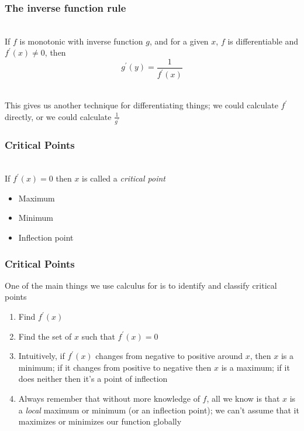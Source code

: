 \documentclass[aspectratio=169, handout]{beamer}
\numberwithin{equation}{section}
\begin{document}
\begin{frame}
\frametitle{The inverse function rule}

\ \\If $f$ is monotonic with inverse function $g$, and for a given $x$, $f$ is differentiable and $f^\prime(x)\not=0$, then $$g^\prime(y) = \frac{1}{f^\prime(x)}$$ \pause


\ \\This gives us another technique for differentiating things; we could calculate $f^\prime$ directly, or we could calculate $\frac{1}{g^\prime}$

\end{frame}




\begin{frame}
\frametitle{Critical Points}

\ \\If $f^\prime(x)=0$ then $x$ is called a \textit{critical point}

\begin{itemize}
\item Maximum
\item Minimum
\item Inflection point
\end{itemize}

\begin{center}
  
\end{center}

\end{frame}



\begin{frame}
\frametitle{Critical Points}

One of the main things we use calculus for is to identify and classify critical points \pause

\begin{enumerate}
\item Find $f^\prime(x)$ \pause
\item Find the set of $x$ such that $f^\prime(x)=0$ \pause
\item Intuitively, if $f^\prime(x)$ changes from negative to positive around $x$, then $x$ is a minimum; if it changes from positive to negative then $x$ is a maximum; if it does neither then it's a point of inflection \pause
\item Always remember that without more knowledge of $f$, all we know is that $x$ is a \textit{local} maximum or minimum (or an inflection point); we can't assume that it maximizes or minimizes our function globally
\end{enumerate}

\end{frame}
\end{document}
